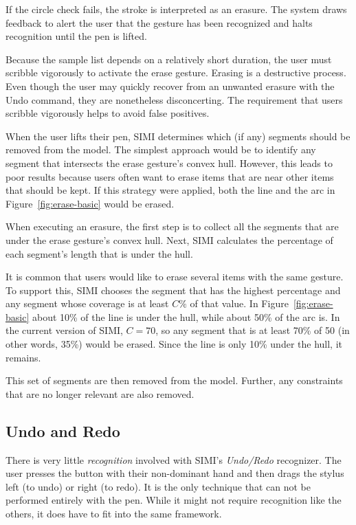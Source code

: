 If the circle check fails, the stroke is interpreted as an
erasure. The system draws feedback to alert the user that the gesture
has been recognized and halts recognition until the pen is lifted.


Because the sample list depends on a relatively short duration, the
user must scribble vigorously to activate the erase gesture. Erasing
is a destructive process. Even though the user may quickly recover
from an unwanted erasure with the Undo command, they are nonetheless
disconcerting. The requirement that users scribble vigorously helps to
avoid false positives.

When the user lifts their pen, SIMI determines which (if any) segments
should be removed from the model. The simplest approach would be to
identify any segment that intersects the erase gesture's convex
hull. However, this leads to poor results because users often want to
erase items that are near other items that should be kept. If this
strategy were applied, both the line and the arc in
Figure~\ref{fig:erase-basic} would be erased.

When executing an erasure, the first step is to collect all the
segments that are under the erase gesture's convex hull. Next, SIMI
calculates the percentage of each segment's length that is under the
hull. 

It is common that users would like to erase several items with the
same gesture. To support this, SIMI chooses the segment that has the
highest percentage and any segment whose coverage is at least $C\%$ of
that value. In Figure~\ref{fig:erase-basic} about 10\% of the line is
under the hull, while about 50\% of the arc is. In the current version
of SIMI, $C=70$, so any segment that is at least 70\% of 50 (in other
words, 35\%) would be erased. Since the line is only 10\% under the
hull, it remains.

This set of segments are then removed from the model. Further, any
constraints that are no longer relevant are also removed.



\subsection{Undo and Redo}

There is very little \textit{recognition} involved with SIMI's
\textit{Undo/Redo} recognizer. The user presses the button with their
non-dominant hand and then drags the stylus left (to undo) or right
(to redo). It is the only technique that can not be performed entirely
with the pen. While it might not require recognition like the others,
it does have to fit into the same framework.

